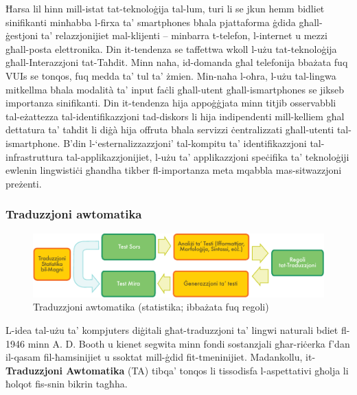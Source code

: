 \documentclass[]{../../metanetpaper}
\begin{document}
\begin{multicols}{2}
Ħarsa lil hinn mill-istat tat-teknoloġija tal-lum, turi li se jkun hemm bidliet sinifikanti minħabba l-firxa ta’ smartphones bħala pjattaforma ġdida għall-ġestjoni ta’ relazzjonijiet mal-klijenti – minbarra t-telefon, l-internet u mezzi għall-posta elettronika. Din it-tendenza se taffettwa wkoll l-użu tat-teknoloġija għall-Interazzjoni tat-Taħdit. Minn naħa, id-domanda għal telefonija bbażata fuq VUIs se tonqos, fuq medda ta' tul ta’ żmien. Min-naħa l-oħra, l-użu tal-lingwa mitkellma bħala modalità ta’ input faċli għall-utent għall-ismartphones se jikseb importanza sinifikanti. Din it-tendenza hija appoġġjata minn titjib osservabbli tal-eżattezza tal-identifikazzjoni tad-diskors li hija indipendenti mill-kelliem għal dettatura ta’ taħdit li diġà hija offruta bħala servizzi ċentralizzati għall-utenti tal-ismartphone. B’din l-‘esternalizzazzjoni’ tal-kompitu ta’ identifikazzjoni tal-infrastruttura tal-applikazzjonijiet, l-użu ta’ applikazzjoni speċifika ta’ teknoloġiji ewlenin lingwistiċi għandha tikber fl-importanza meta mqabbla mas-sitwazzjoni preżenti.


\subsubsection{Traduzzjoni awtomatika}

\begin{figure}[htb]
  \centering
  \includegraphics[width=\textwidth]{../_media/maltese/machine_translation}
  \caption{Traduzzjoni awtomatika (statistika; ibbażata fuq regoli)}
  \label{fig:mtarch_mt}
\end{figure}

L-idea tal-użu ta’ kompjuters diġitali għat-traduzzjoni ta’ lingwi naturali bdiet fl-1946 minn A. D. Booth u kienet segwita minn fondi sostanzjali għar-riċerka f'dan il-qasam fil-ħamsinijiet u ssoktat mill-ġdid fit-tmeninijiet. Madankollu, it-\textbf{Traduzzjoni Awtomatika} (TA) tibqa’ tonqos li tissodisfa l-aspettativi għolja li ħolqot fis-snin bikrin tagħha.



\end{multicols}
\end{document}
